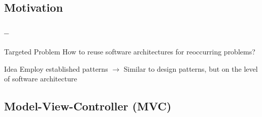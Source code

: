 \subsection{Motivation}

\begin{frame}
    \frametitle{\insertsection{} -- \insertsubsection{}}

    \begin{motivation}{Targeted Problem}
        How to reuse software architectures for reoccurring problems?
    \end{motivation}

    \begin{motivation}{Idea}
        Employ established patterns $\rightarrow$ Similar to design patterns, but on the level of software architecture
    \end{motivation}


\end{frame}

\subsection{Model-View-Controller (MVC)} %

\newcommand{\mvcdefault}{%
    \begin{figure}
        \centering
        \begin{tikzpicture}
            \node (model) at (0,0) [draw, minimum width=2cm, minimum height=1cm] {Model};
            \node (view) at (6,0) [draw, minimum width=2cm, minimum height=1cm] {View};
            \node (controller) at (3,-4.5) [draw, minimum width=2cm, minimum height=1cm] {Controller};

            \draw[->] (controller) to node[above, midway, sloped] {Manipulates} (model);

            \draw[->, bend left=12] (controller) to node[ above, midway, sloped] {Select Presentation} (view);
            \draw[->, bend left=12] (view) to node[below, midway, sloped] {(User) Input} (controller);

            \draw[->, bend left=12] (model) to node[above, midway, sloped] {Notify change} (view);
        \end{tikzpicture}
    \end{figure}%
}

